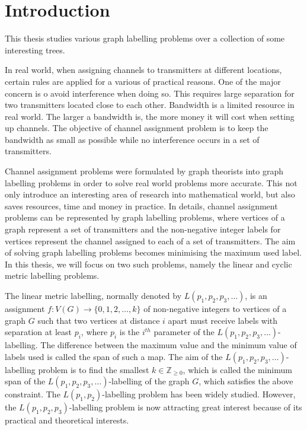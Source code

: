 \chapter{Introduction}

This thesis studies various graph labelling problems over a collection of some interesting trees. 

In real world, when assigning channels to transmitters at different locations, certain rules are applied for a various of practical reasons. One of the major concern is o avoid interference when doing so. This requires large separation for two transmitters located close to each other. Bandwidth is a limited resource in real world. The larger a bandwidth is, the more money it will cost when setting up channels. The objective of channel assignment problem is to keep the bandwidth as small as possible while no interference occurs in a set of transmitters. 

Channel assignment problems were formulated by graph theorists into graph labelling problems in order to solve real world problems more accurate. This not only introduce an interesting area of research into mathematical world, but also saves resources, time and money in practice. In details, channel assignment problems can be represented by graph labelling problems, where vertices of a graph represent a set of transmitters and the non-negative integer labels for vertices represent the channel assigned to each of a set of transmitters. The aim of solving graph labelling problems becomes minimising the maximum used label. In this thesis, we will focus on two such problems, namely the linear and cyclic metric labelling problems. 

The linear metric labelling, normally denoted by $L(p_1, p_2, p_3, \dots)$, is an assignment $f: V(G) \rightarrow \{0, 1, 2, \dots, k\}$ of non-negative integers to vertices of a graph $G$ such that two vertices at distance $i$ apart must receive labels with separation at least $p_i$, where $p_i$ is the $i^{th}$ parameter of the $L(p_1, p_2, p_3, \dots)$-labelling. The difference between the maximum value and the minimum value of labels used is called the span of such a map. The aim of the $L(p_1, p_2, p_3, \dots)$-labelling problem is to find the smallest $k \in \mathbb{Z}_{\ge 0}$, which is called the minimum span of the $L(p_1, p_2, p_3, \dots)$-labelling of the graph $G$, which satisfies the above constraint. The $L(p_1, p_2)$-labelling problem has been widely studied. However, the $L(p_1,p_2,p_3)$-labelling problem is now attracting great interest because of its practical and theoretical interests. 

